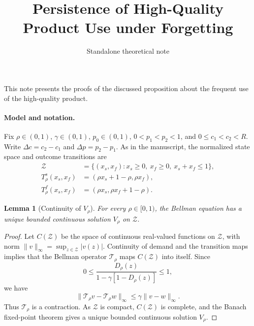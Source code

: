 \documentclass[11pt]{article}
\title{Persistence of High-Quality Product Use under Forgetting}
\author{Standalone theoretical note}
\date{}
\newtheorem{lemma}{Lemma}
\begin{document}
\maketitle

This note presents the proofs of the discussed proposition about the frequent use of the high-quality product.


\paragraph{Model and notation.}
Fix $\rho\in(0,1)$, $\gamma\in(0,1)$, $p_0\in(0,1)$,
$0<p_1<p_2<1$, and $0\leq c_1<c_2<R$.
Write $\Delta c=c_2-c_1$ and $\Delta p=p_2-p_1$.
As in the manuscript, the normalized state space and outcome transitions are
\begin{align*}
\mathcal Z&=\{(x_s,x_f):x_s\geq0,\ x_f\geq0,\ x_s+x_f\leq1\},\\
T_\rho^s(x_s,x_f)&=(\rho x_s+1-\rho,\rho x_f),\\
T_\rho^f(x_s,x_f)&=(\rho x_s,\rho x_f+1-\rho).
\end{align*}

\begin{lemma}[Continuity of $V_\rho$]For every $\rho\in[0,1)$, the Bellman equation has a unique bounded continuous solution $V_\rho$ on $\mathcal Z$.
\end{lemma}

\begin{proof}
Let $C(\mathcal Z)$ be the space of continuous real-valued functions on
$\mathcal Z$, with norm $\|v\|_\infty=\sup_{z\in\mathcal Z}|v(z)|$.
Continuity of demand and the transition maps implies that the Bellman
operator $\mathcal T_\rho$ maps $C(\mathcal Z)$ into itself. Since
\begin{equation*}
0\leq\frac{D_\rho(z)}{1-\gamma[1-D_\rho(z)]}\leq1,
\end{equation*}
we have
\begin{equation*}
\|\mathcal T_\rho v-\mathcal T_\rho w\|_\infty
\leq\gamma\|v-w\|_\infty.
\end{equation*}
Thus $\mathcal T_\rho$ is a contraction. As $\mathcal Z$ is compact,
$C(\mathcal Z)$ is complete, and the Banach fixed-point theorem gives
a unique bounded continuous solution $V_\rho$.
\end{proof}
\end{document}
